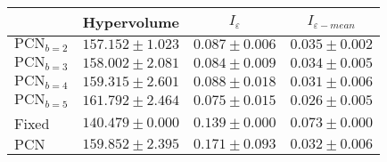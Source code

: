 
\begin{tabular}{|l|c|c|c|}
    \hline
        & Hypervolume & $I_\varepsilon$ & $I_{\varepsilon-mean}$ \\
    \hline
    $\text{PCN}_{b=2}$ & $157.152 \pm 1.023$ & $0.087 \pm 0.006$ & $0.035 \pm 0.002$  \\
    \hline
    $\text{PCN}_{b=3}$ & $158.002 \pm 2.081$ & $0.084 \pm 0.009$ & $0.034 \pm 0.005$ \\
    \hline
    $\text{PCN}_{b=4}$ & $159.315 \pm 2.601$ & $0.088 \pm 0.018$ & $0.031 \pm 0.006$ \\
    \hline
    $\text{PCN}_{b=5}$ & $161.792 \pm 2.464$ & $0.075 \pm 0.015$ & $0.026 \pm 0.005$ \\
    \hline
    Fixed & $140.479 \pm 0.000$ & $0.139 \pm 0.000$ & $0.073 \pm 0.000$ \\
    \hline
    $\text{PCN}$ & $159.852 \pm 2.395$ & $0.171 \pm 0.093$ & $0.032 \pm 0.006$ \\
    \hline
\end{tabular}